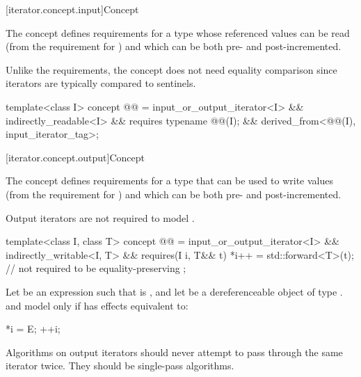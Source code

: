 [iterator.concept.input]{Concept }

\pnum
The  concept defines requirements for a type
whose referenced values can be read (from the requirement for
)
and which can be both pre- and post-incremented.
\begin{note}
Unlike the  requirements,
the  concept does not need
equality comparison since iterators are typically compared to sentinels.
\end{note}

\begin{codeblock}
template<class I>
  concept @@ =
    input_or_output_iterator<I> &&
    indirectly_readable<I> &&
    requires { typename @@(I); } &&
    derived_from<@@(I), input_iterator_tag>;
\end{codeblock}

[iterator.concept.output]{Concept }

\pnum
The  concept defines requirements for a type that
can be used to write values (from the requirement for
)
and which can be both pre- and post-incremented.
\begin{note}
Output iterators are not required to model .
\end{note}

\begin{codeblock}
template<class I, class T>
  concept @@ =
    input_or_output_iterator<I> &&
    indirectly_writable<I, T> &&
    requires(I i, T&& t) {
      *i++ = std::forward<T>(t);        // not required to be equality-preserving
    };
\end{codeblock}

\pnum
Let  be an expression such that  is , and let  be a
dereferenceable object of type .  and  model  only if
 has effects equivalent to:
\begin{codeblock}
*i = E;
++i;
\end{codeblock}

\pnum
\begin{note}
Algorithms on output iterators should never attempt to pass through the same iterator twice.
They should be single-pass algorithms.
\end{note}

